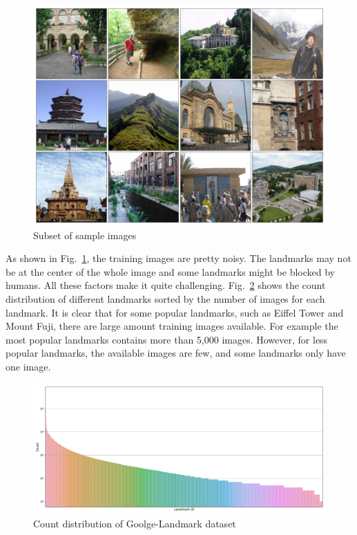 \documentclass[final,3p]{elsarticle}
\begin{document}
\begin{figure}[hbtp]
\centering\includegraphics[width=0.94\linewidth]{./figures/sample.png}
\caption{Subset of sample images}
\label{fig:sample}
\end{figure}

As shown in Fig.~\ref{fig:sample}, the training images are pretty noisy. The landmarks may not be at the center of the whole image and some landmarks might be blocked by humans. All these factors make it quite challenging. Fig.~\ref{fig:all_distribution} shows the count distribution of different landmarks sorted by the number of images for each landmark. It is clear that for some popular landmarks, such as Eiffel Tower and Mount Fuji, there are large amount training images available. For example the most popular landmarks contains more than 5,000 images. However, for less popular landmarks, the available images are few, and some landmarks only have one image. 

\begin{figure}[htbp]
\centering\includegraphics[width=1.0\linewidth]{./figures/all_distribution.png}
\caption{Count distribution of Goolge-Landmark dataset}
\label{fig:all_distribution}
\end{figure}
\end{document}
